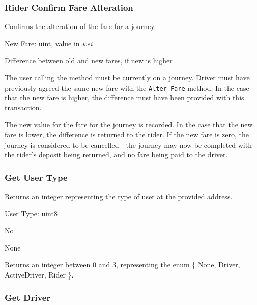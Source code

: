 \subsubsection{Rider Confirm Fare Alteration}

\begin{description}[leftmargin=8em,style=nextline]
	\item [Description]
		Confirms the alteration of the fare for a journey.
	\item [Arguments]
		New Fare: uint, value in \textit{wei}
	\item [Payable]
		Difference between old and new fares, if new is higher
	\item [Preconditions]
		The user calling the method must be currently on a journey. Driver must have previously agreed the same new fare with the \lstinline{Alter Fare} method. In the case that the new fare is higher, the difference must have been provided with this transaction.
	\item [Postconditions]
		The new value for the fare for the journey is recorded. In the case that the new fare is lower, the difference is returned to the rider. If the new fare is zero, the journey is considered to be cancelled - the journey may now be completed with the rider's deposit being returned, and no fare being paid to the driver.
\end{description}

\subsubsection{Get User Type}

\begin{description}[leftmargin=8em,style=nextline]
	\item [Description]
		Returns an integer representing the type of user at the provided address.
	\item [Arguments]
		User Type: uint8
	\item [Payable]
		No
	\item [Preconditions]
		None
	\item [Postconditions]
		Returns an integer between 0 and 3, representing the enum \{ None, Driver, ActiveDriver, Rider \}.
\end{description}

\subsubsection{Get Driver}

